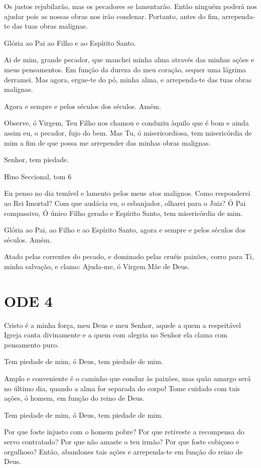 \documentclass{subfiles}
\begin{document}
Os justos rejubilarão, mas os pecadores se lamentarão. Então ninguém poderá nos
ajudar pois as nossas obras nos irão condenar. Portanto, antes do fim,
arrependa-te das tuas obras malignas.

Glória ao Pai ao Filho e ao Espírito Santo.

Ai de mim, grande pecador, que manchei minha alma através das minhas ações e
meus pensamentos. Em função da dureza do meu coração, sequer uma lágrima
derramei. Mas agora, ergue-te do pó, minha alma, e arrependa-te das tuas obras
malignas.

Agora e sempre e pelos séculos dos séculos. Amém.

\theotokion{}Observe, ó Virgem, Teu Filho nos chamou e conduziu àquilo que é bom
e ainda assim eu, o pecador, fujo do bem. Mas Tu, ó misericordiosa, tem
misericórdia de mim a fim de que possa me arrepender das minhas obras malignas.

Senhor, tem piedade. 

Hino Seccional, tom 6

Eu penso no dia temível e lamento pelos meus atos malignos. Como responderei ao
Rei Imortal? Com que audácia eu, o esbanjador, olharei para o Juiz? Ó Pai
compassivo, Ó único Filho gerado e Espírito Santo, tem misericórdia de mim.

Glória ao Pai, ao Filho e ao Espírito Santo, agora e sempre e pelos séculos dos
séculos. Amém.

\theotokion{}Atado pelas correntes do pecado, e dominado pelas cruéis paixões,
corro para Ti, minha salvação, e clamo: Ajuda-me, ó Virgem Mãe de Deus.

\section{ODE 4}

\eirmos{}Cristo é a minha força, meu Deus e meu Senhor, aquele a quem a
respeitável Igreja canta divinamente e a quem com alegria no Senhor ela clama
com pensamento puro.

Tem piedade de mim, ó Deus, tem piedade de mim.

Amplo e conveniente é o caminho que conduz às paixões, mas quão amargo será no
último dia, quando a alma for separada do corpo! Tome cuidado com tais ações, ó
homem, em função do reino de Deus.

Tem piedade de mim, ó Deus, tem piedade de mim.

Por que foste injusto com o homem pobre? Por que retiveste a recompensa do servo
contratado? Por que não amaste o teu irmão? Por que foste cobiçoso e orgulhoso?
Então, abandones tais ações e arrependa-te em função do reino de Deus.
\end{document}
